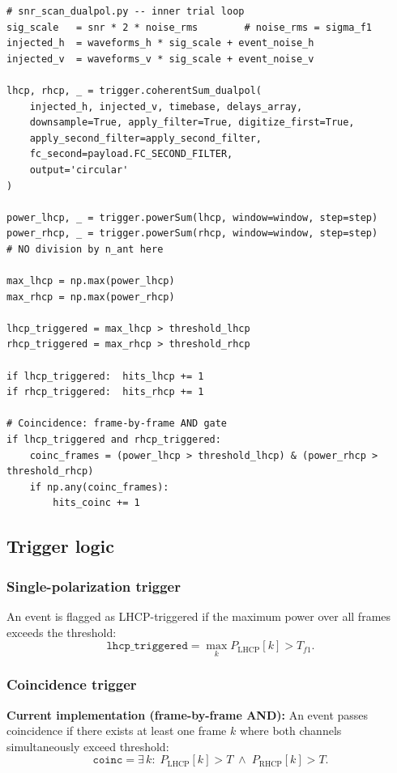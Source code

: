 \documentclass[11pt,letterpaper]{article}
\newenvironment{codebox}{%
  \begin{mdframed}[backgroundcolor=codebg,linewidth=0.5pt,innerleftmargin=6pt,innerrightmargin=6pt,innertopmargin=4pt,innerbottommargin=4pt]%
  \small}{\end{mdframed}}
\begin{document}
\begin{codebox}
\begin{Verbatim}
# snr_scan_dualpol.py -- inner trial loop
sig_scale   = snr * 2 * noise_rms        # noise_rms = sigma_f1
injected_h  = waveforms_h * sig_scale + event_noise_h
injected_v  = waveforms_v * sig_scale + event_noise_v

lhcp, rhcp, _ = trigger.coherentSum_dualpol(
    injected_h, injected_v, timebase, delays_array,
    downsample=True, apply_filter=True, digitize_first=True,
    apply_second_filter=apply_second_filter,
    fc_second=payload.FC_SECOND_FILTER,
    output='circular'
)

power_lhcp, _ = trigger.powerSum(lhcp, window=window, step=step)
power_rhcp, _ = trigger.powerSum(rhcp, window=window, step=step)
# NO division by n_ant here

max_lhcp = np.max(power_lhcp)
max_rhcp = np.max(power_rhcp)

lhcp_triggered = max_lhcp > threshold_lhcp
rhcp_triggered = max_rhcp > threshold_rhcp

if lhcp_triggered:  hits_lhcp += 1
if rhcp_triggered:  hits_rhcp += 1

# Coincidence: frame-by-frame AND gate
if lhcp_triggered and rhcp_triggered:
    coinc_frames = (power_lhcp > threshold_lhcp) & (power_rhcp > threshold_rhcp)
    if np.any(coinc_frames):
        hits_coinc += 1
\end{Verbatim}
\end{codebox}

\subsection{Trigger logic}

\subsubsection{Single-polarization trigger}

An event is flagged as LHCP-triggered if the maximum power over all frames
exceeds the threshold:
\[
  \mathtt{lhcp\_triggered} = \max_k P_\mathrm{LHCP}[k] > T_{f1}.
\]

\subsubsection{Coincidence trigger}

\textbf{Current implementation (frame-by-frame AND):} An event passes
coincidence if there exists at least one frame $k$ where both channels
simultaneously exceed threshold:
\[
  \mathtt{coinc} = \exists\,k:\;
  P_\mathrm{LHCP}[k] > T \;\wedge\; P_\mathrm{RHCP}[k] > T.
\]
\end{document}
